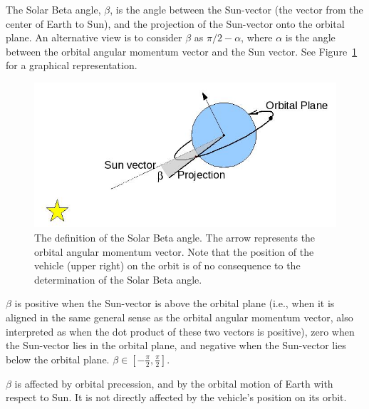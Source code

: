 %
%
% 
%



The Solar Beta angle, $\beta$, is the angle between the Sun-vector (the vector from the center of Earth to Sun), and the projection of the Sun-vector onto the orbital plane.  An alternative view is to consider $\beta$ as $\pi /2 - \alpha$, where $\alpha$ is the angle between the orbital angular momentum vector and the Sun vector.  See Figure~\ref{fig:solarbetaintro} for a graphical representation.

\begin{figure}[htp]
\begin{center}
\includegraphics[width=5in]{figures/solar_beta.jpg}
\caption{The definition of the Solar Beta angle.  The arrow represents the orbital angular momentum vector.  Note that the position of the vehicle (upper right) on the orbit is of no consequence to the determination of the Solar Beta angle.}
\label{fig:solarbetaintro}
\end{center}
\end{figure}

$\beta$ is positive when the Sun-vector is above the orbital plane (i.e., when it is aligned in the same general sense as the orbital angular momentum vector, also interpreted as when the dot product of these two vectors is positive), zero when the Sun-vector lies in the orbital plane, and negative when the Sun-vector lies below the orbital plane.  $\beta \in \left[ -\frac{\pi}{2}, \frac{\pi}{2} \right]$.  

$\beta$ is affected by orbital precession, and by the orbital motion of Earth with respect to Sun.  It is not directly affected by the vehicle's position on its orbit.

